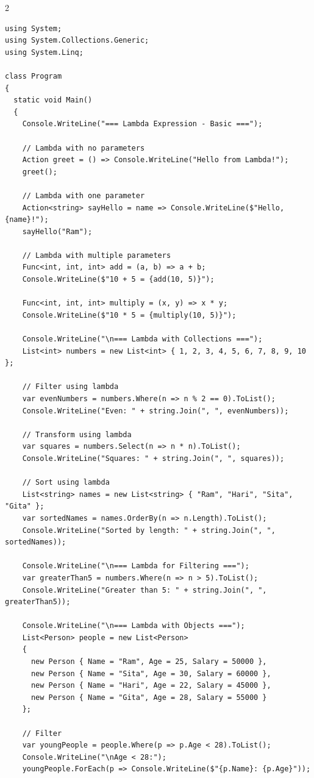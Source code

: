 \documentclass[10pt,a4paper]{article}
\begin{document}
\begin{multicols}{2}
\begin{lstlisting}
using System;
using System.Collections.Generic;
using System.Linq;

class Program
{
  static void Main()
  {
    Console.WriteLine("=== Lambda Expression - Basic ===");
    
    // Lambda with no parameters
    Action greet = () => Console.WriteLine("Hello from Lambda!");
    greet();
    
    // Lambda with one parameter
    Action<string> sayHello = name => Console.WriteLine($"Hello, {name}!");
    sayHello("Ram");
    
    // Lambda with multiple parameters
    Func<int, int, int> add = (a, b) => a + b;
    Console.WriteLine($"10 + 5 = {add(10, 5)}");
    
    Func<int, int, int> multiply = (x, y) => x * y;
    Console.WriteLine($"10 * 5 = {multiply(10, 5)}");
    
    Console.WriteLine("\n=== Lambda with Collections ===");
    List<int> numbers = new List<int> { 1, 2, 3, 4, 5, 6, 7, 8, 9, 10 };
    
    // Filter using lambda
    var evenNumbers = numbers.Where(n => n % 2 == 0).ToList();
    Console.WriteLine("Even: " + string.Join(", ", evenNumbers));
    
    // Transform using lambda
    var squares = numbers.Select(n => n * n).ToList();
    Console.WriteLine("Squares: " + string.Join(", ", squares));
    
    // Sort using lambda
    List<string> names = new List<string> { "Ram", "Hari", "Sita", "Gita" };
    var sortedNames = names.OrderBy(n => n.Length).ToList();
    Console.WriteLine("Sorted by length: " + string.Join(", ", sortedNames));
    
    Console.WriteLine("\n=== Lambda for Filtering ===");
    var greaterThan5 = numbers.Where(n => n > 5).ToList();
    Console.WriteLine("Greater than 5: " + string.Join(", ", greaterThan5));
    
    Console.WriteLine("\n=== Lambda with Objects ===");
    List<Person> people = new List<Person>
    {
      new Person { Name = "Ram", Age = 25, Salary = 50000 },
      new Person { Name = "Sita", Age = 30, Salary = 60000 },
      new Person { Name = "Hari", Age = 22, Salary = 45000 },
      new Person { Name = "Gita", Age = 28, Salary = 55000 }
    };
    
    // Filter
    var youngPeople = people.Where(p => p.Age < 28).ToList();
    Console.WriteLine("\nAge < 28:");
    youngPeople.ForEach(p => Console.WriteLine($"{p.Name}: {p.Age}"));
    

\end{lstlisting}
\end{multicols}
\end{document}
